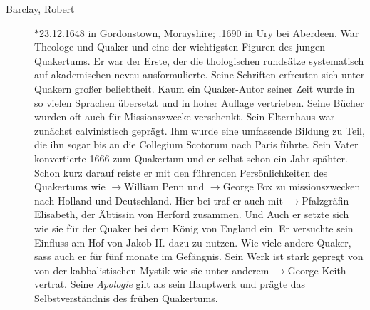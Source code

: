 \begin{description}
 \item[Barclay, Robert] $\ast$23.12.1648 in Gordonstown, Morayshire;
.1690 in Ury bei Aberdeen. War Theologe und Quaker und eine der
wichtigsten Figuren des jungen Quakertums. Er war der Erste, der die
thologischen rundsätze systematisch auf akademischen neveu ausformulierte. Seine
Schriften erfreuten sich unter Quakern großer beliebtheit. Kaum ein Quaker-Autor
seiner Zeit wurde in so vielen Sprachen übersetzt und in hoher Auflage
vertrieben. Seine Bücher wurden oft auch für Missionszwecke verschenkt. Sein
Elternhaus war zunächst calvinistisch geprägt. Ihm wurde eine umfassende Bildung
zu Teil, die ihn sogar bis an die Collegium Scotorum nach Paris führte. Sein
Vater konvertierte 1666 zum Quakertum und er selbst schon ein Jahr spähter.
Schon kurz darauf reiste er mit den führenden Persönlichkeiten des Quakertums
wie $\to$William Penn und $\to$George Fox zu missionszwecken nach Holland und
Deutschland. Hier bei traf er auch mit $\to$Pfalzgräfin Elisabeth, der Äbtissin
von Herford zusammen. Und Auch er setzte sich wie sie für der Quaker bei dem
König von England ein. Er versuchte sein Einfluss am Hof von Jakob II. dazu zu
nutzen. Wie viele andere Quaker, sass auch er für fünf monate im Gefängnis. Sein
Werk ist stark gepregt von von der kabbalistischen Mystik wie sie unter anderem
$\to$George Keith vertrat. Seine \textit{Apologie} gilt als sein Hauptwerk und
prägte das Selbstverständnis des frühen Quakertums.  




\end{description}

